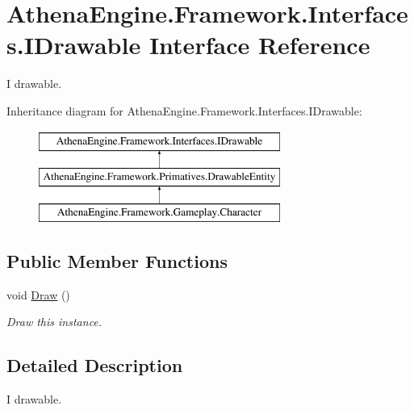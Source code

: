 \hypertarget{interface_athena_engine_1_1_framework_1_1_interfaces_1_1_i_drawable}{\section{Athena\-Engine.\-Framework.\-Interfaces.\-I\-Drawable Interface Reference}
\label{interface_athena_engine_1_1_framework_1_1_interfaces_1_1_i_drawable}
}


I drawable.  


Inheritance diagram for Athena\-Engine.\-Framework.\-Interfaces.\-I\-Drawable\-:\begin{figure}[H]
\begin{center}
\leavevmode
\includegraphics[height=3.000000cm]{interface_athena_engine_1_1_framework_1_1_interfaces_1_1_i_drawable}
\end{center}
\end{figure}
\subsection*{Public Member Functions}
\begin{DoxyCompactItemize}
\item 
void \hyperlink{interface_athena_engine_1_1_framework_1_1_interfaces_1_1_i_drawable_a142a47eaf66e1f6c90b7d3445e36cde2}{Draw} ()
\begin{DoxyCompactList}\small\item\em Draw this instance. \end{DoxyCompactList}\end{DoxyCompactItemize}


\subsection{Detailed Description}
I drawable. 



